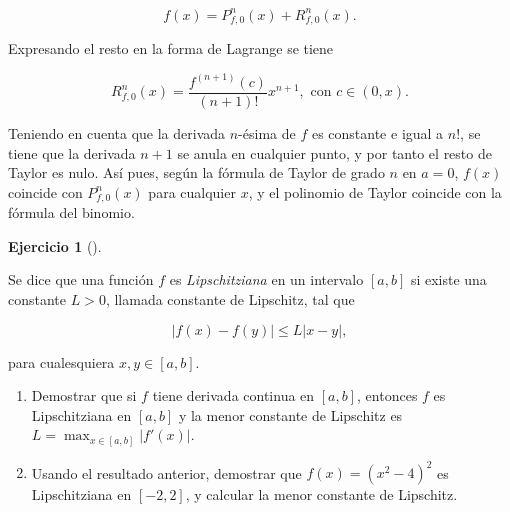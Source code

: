 \documentclass[
  spanish,
  a4paper,
]{scrreport}
\theoremstyle{definition}
\newtheorem{exercise}{Ejercicio}[chapter]
\theoremstyle{remark}
\begin{document}
\begin{tcolorbox}
\[
f(x) = P^n_{f,0}(x) + R^n_{f,0}(x).
\]

Expresando el resto en la forma de Lagrange se tiene

\[
R^n_{f,0}(x) = \frac{f^{(n+1)}(c)}{(n+1)!}x^{n+1}, \mbox{ con $c\in(0,x)$}. 
\]

Teniendo en cuenta que la derivada \(n\)-ésima de \(f\) es constante e
igual a \(n!\), se tiene que la derivada \(n+1\) se anula en cualquier
punto, y por tanto el resto de Taylor es nulo. Así pues, según la
fórmula de Taylor de grado \(n\) en \(a=0\), \(f(x)\) coincide con
\(P^n_{f,0}(x)\) para cualquier \(x\), y el polinomio de Taylor coincide
con la fórmula del binomio.

\end{tcolorbox}

\begin{exercise}[]\protect\hypertarget{exr-8}{}\label{exr-8}

Se dice que una función \(f\) es \emph{Lipschitziana} en un intervalo
\([a,b]\) si existe una constante \(L>0\), llamada constante de
Lipschitz, tal que

\[
|f(x)-f(y)|\leq L|x-y|,
\]

para cualesquiera \(x,y\in [a,b]\).

\begin{enumerate}
\def\labelenumi{\alph{enumi}.}
\item
  Demostrar que si \(f\) tiene derivada continua en \([a,b]\), entonces
  \(f\) es Lipschitziana en \([a,b]\) y la menor constante de Lipschitz
  es \(L=\max_{x\in [a,b]}|f'(x)|\).
\item
  Usando el resultado anterior, demostrar que \(f(x) = (x^2-4)^2\) es
  Lipschitziana en \([-2,2]\), y calcular la menor constante de
  Lipschitz.
\end{enumerate}

\end{exercise}
\end{document}

